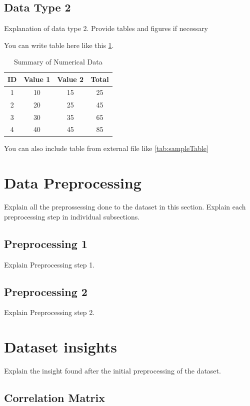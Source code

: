 \subsection{Data Type 2}
Explanation of data type 2. Provide tables and figures if necessary

You can write table here like this \ref{tab:numerical_data}.
\begin{table}[h]
    \centering
    \caption{Summary of Numerical Data}
    \label{tab:numerical_data} 
    \begin{tabular}{|c|c|c|c|}
        \hline
        \textbf{ID} & \textbf{Value 1} & \textbf{Value 2} & \textbf{Total} \\ 
        \hline
        1 & 10 & 15 & 25 \\ 
        2 & 20 & 25 & 45 \\ 
        3 & 30 & 35 & 65 \\ 
        4 & 40 & 45 & 85 \\ 
        \hline
    \end{tabular}
\end{table}

You can also include table from external file like \ref{tab:sampleTable}



\section{Data Preprocessing}

Explain all the preprossessing done to the dataset in this section. Explain each preprocessing step in individual subsections.

\subsection{Preprocessing 1}
Explain Preprocessing step 1.


\subsection{Preprocessing 2}
Explain Preprocessing step 2.



\section{Dataset insights}
Explain the insight found after the initial preprocessing of the dataset.
\subsection{Correlation Matrix}

